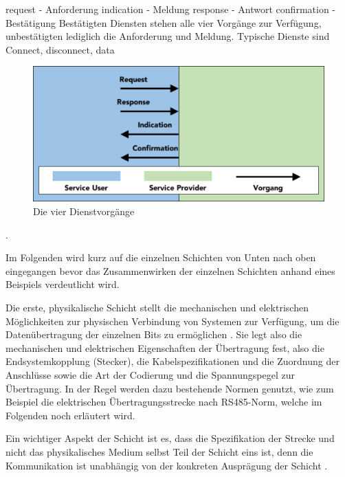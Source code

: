 request - Anforderung
indication - Meldung
response - Antwort
confirmation - Bestätigung
Bestätigten Diensten stehen alle vier Vorgänge zur Verfügung, unbestätigten lediglich die Anforderung und Meldung.
Typische Dienste sind Connect, disconnect, data

\begin{figure}
\centering
\includegraphics[width=\textwidth]{abbildungen/20160310_vorgang}
\caption{Die vier Dienstvorgänge}
\label{fig:vorgang}
\end{figure}

\cite[S.~14f.]{schn06}.

Im Folgenden wird kurz auf die einzelnen Schichten von Unten nach oben eingegangen bevor das Zusammenwirken der einzelnen Schichten anhand eines Beispiels verdeutlicht wird. %

Die erste, physikalische Schicht stellt die mechanischen und elektrischen Möglichkeiten zur physischen Verbindung von Systemen zur Verfügung, um die Datenübertragung der einzelnen Bits zu ermöglichen \cite[S.~49f.]{osi96}. Sie legt also die mechanischen und elektrischen Eigenschaften der Übertragung fest, also die Endsystemkopplung (Stecker), die Kabelspezifikationen und die Zuordnung der Anschlüsse sowie die Art der Codierung und die Spannungspegel zur Übertragung. In der Regel werden dazu bestehende Normen genutzt, wie zum Beispiel die elektrischen Übertragungsstrecke nach RS485-Norm, welche im Folgenden noch erläutert wird.

Ein wichtiger Aspekt der Schicht ist es, dass die Spezifikation der Strecke und nicht das physikalisches Medium selbst Teil der Schicht eins ist, denn die Kommunikation ist unabhängig von der konkreten Ausprägung der Schicht \cite[S.~9]{schn06}.

